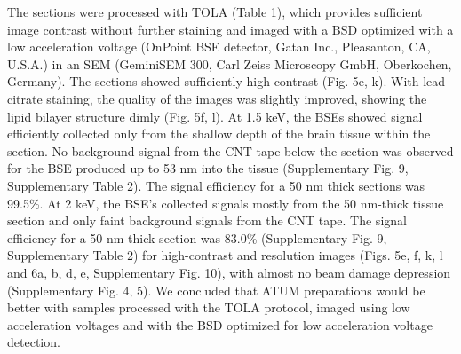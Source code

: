 \documentclass{article}
\begin{document}

The sections were processed with TOLA (Table 1), which provides sufficient image contrast without further staining and imaged with a BSD optimized with a low acceleration voltage (OnPoint BSE detector, Gatan Inc., Pleasanton, CA, U.S.A.) in an SEM (GeminiSEM 300, Carl Zeiss Microscopy GmbH, Oberkochen, Germany). The sections showed sufficiently high contrast (Fig. 5e, k). With lead citrate staining, the quality of the images was slightly improved, showing the lipid bilayer structure dimly (Fig. 5f, l). At 1.5 keV, the BSEs showed signal efficiently collected only from the shallow depth of the brain tissue within the section. No background signal from the CNT tape below the section was observed for the BSE produced up to 53 nm into the tissue (Supplementary Fig. 9, Supplementary Table 2). The signal efficiency for a 50 nm thick sections was 99.5\%. At 2 keV, the BSE’s collected signals mostly from the 50 nm-thick tissue section and only faint background signals from the CNT tape. The signal efficiency for a 50 nm thick section was 83.0\% (Supplementary Fig. 9, Supplementary Table 2) for high-contrast and resolution images (Figs. 5e, f, k, l and 6a, b, d, e, Supplementary Fig. 10), with almost no beam damage depression (Supplementary Fig. 4, 5). We concluded that ATUM preparations would be better with samples processed with the TOLA protocol, imaged using low acceleration 
voltages and with the BSD optimized for low acceleration voltage detection.
\end{document}
